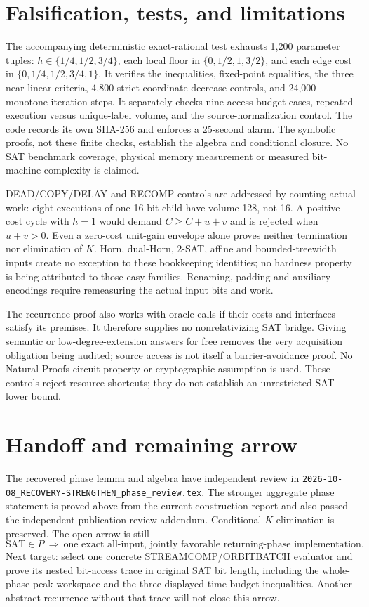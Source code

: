 \documentclass[11pt]{article}
\begin{document}
\section*{Falsification, tests, and limitations}
The accompanying deterministic exact-rational test exhausts 1,200 parameter
tuples: $h\in\{1/4,1/2,3/4\}$, each local floor in
$\{0,1/2,1,3/2\}$, and each edge cost in $\{0,1/4,1/2,3/4,1\}$.
It verifies the inequalities, fixed-point equalities, the three near-linear
criteria, 4,800 strict coordinate-decrease controls, and 24,000 monotone
iteration steps. It separately checks nine access-budget cases, repeated
execution versus unique-label volume, and the source-normalization control.
The code records its own SHA-256 and enforces a 25-second alarm. The
symbolic proofs, not these finite checks, establish the algebra and
conditional closure. No SAT benchmark coverage, physical memory measurement
or measured bit-machine complexity is claimed.

DEAD/COPY/DELAY and RECOMP controls are addressed by counting actual work:
eight executions of one 16-bit child have volume 128, not 16. A positive
cost cycle with $h=1$ would demand $C\ge C+u+v$ and is rejected when
$u+v>0$. Even a zero-cost unit-gain envelope alone proves neither termination
nor elimination of $K$. Horn, dual-Horn, 2-SAT, affine and bounded-treewidth
inputs create no exception to these bookkeeping identities; no hardness
property is being attributed to those easy families. Renaming, padding and
auxiliary encodings require remeasuring the actual input bits and work.

The recurrence proof also works with oracle calls if their costs and
interfaces satisfy its premises. It therefore supplies no nonrelativizing
SAT bridge. Giving semantic or low-degree-extension answers for free
removes the very acquisition obligation being audited; source access is
not itself a barrier-avoidance proof. No Natural-Proofs circuit property
or cryptographic assumption is used. These controls reject resource
shortcuts; they do not establish an unrestricted SAT lower bound.

\section*{Handoff and remaining arrow}
The recovered phase lemma and algebra have independent review in
\nolinkurl{2026-10-08_RECOVERY-STRENGTHEN_phase_review.tex}.
The stronger aggregate phase statement is proved above from the current
construction report and also passed the independent publication review
addendum. Conditional $K$ elimination is preserved. The open
arrow is still
\[
 \mathrm{SAT}\in P\ \Longrightarrow\
 \text{one exact all-input, jointly favorable returning-phase implementation}.
\]
Next target: select one concrete STREAMCOMP/ORBITBATCH evaluator and prove
its nested bit-access trace in original SAT bit length, including the
whole-phase peak workspace and the three displayed time-budget inequalities.
Another abstract recurrence without that trace will not close this arrow.
\end{document}

